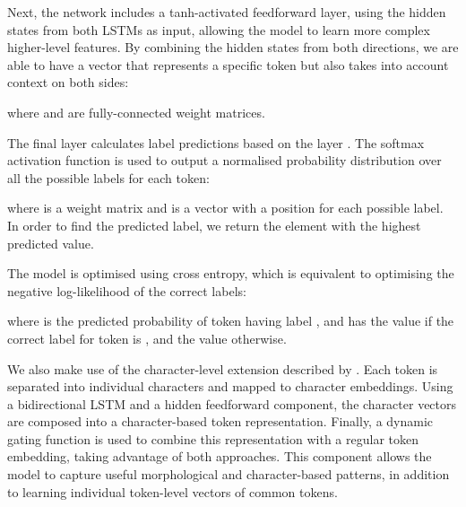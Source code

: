 \documentclass[11pt,letterpaper]{article}
\begin{document}
Next, the network includes a {tanh}-activated feedforward layer, using the hidden states from both LSTMs as input, allowing the model to learn more complex higher-level features.
By combining the hidden states from both directions, we are able to have a vector that represents a specific token but also takes into account context on both sides:


\noindent where  and  are fully-connected weight matrices.

The final layer calculates label predictions based on the layer .
The softmax activation function is used to output a normalised probability distribution over all the possible labels for each token:


\noindent where  is a weight matrix and  is a vector with a position for each possible label. In order to find the predicted label, we return the element with the highest predicted value.

The model is optimised using cross entropy, which is equivalent to optimising the negative log-likelihood of the correct labels:



\noindent where  is the predicted probability of token  having label , and  has the value  if the correct label for token  is , and the value  otherwise.

We also make use of the character-level extension described by . Each token is separated into individual characters and mapped to character embeddings. Using a bidirectional LSTM and a hidden feedforward component, the character vectors are composed into a character-based token representation. Finally, a dynamic gating function is used to combine this representation with a regular token embedding, taking advantage of both approaches. This component allows the model to capture useful morphological and character-based patterns, in addition to learning individual token-level vectors of common tokens.
\end{document}
